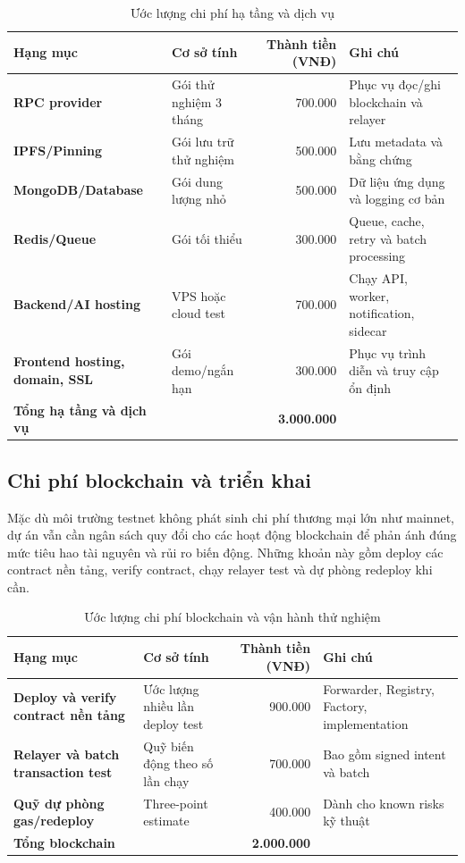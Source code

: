 \begin{table}[H]
\centering
\caption{Ước lượng chi phí hạ tầng và dịch vụ}
\label{tab:infra-cost-estimate}
\begin{tabularx}{\textwidth}{| >{\bfseries}p{4.5cm} | p{4cm} | r | X |}
\hline
Hạng mục & Cơ sở tính & Thành tiền (VNĐ) & Ghi chú \\
\hline
RPC provider & Gói thử nghiệm 3 tháng & 700.000 & Phục vụ đọc/ghi blockchain và relayer \\ \hline
IPFS/Pinning & Gói lưu trữ thử nghiệm & 500.000 & Lưu metadata và bằng chứng \\ \hline
MongoDB/Database & Gói dung lượng nhỏ & 500.000 & Dữ liệu ứng dụng và logging cơ bản \\ \hline
Redis/Queue & Gói tối thiểu & 300.000 & Queue, cache, retry và batch processing \\ \hline
Backend/AI hosting & VPS hoặc cloud test & 700.000 & Chạy API, worker, notification, sidecar \\ \hline
Frontend hosting, domain, SSL & Gói demo/ngắn hạn & 300.000 & Phục vụ trình diễn và truy cập ổn định \\
\hline
\textbf{Tổng hạ tầng và dịch vụ} &  & \textbf{3.000.000} &  \\
\hline
\end{tabularx}
\end{table}

\iffalse
\subsection{Chi phí blockchain và triển khai}

Mặc dù môi trường testnet không phát sinh chi phí thương mại lớn như mainnet, dự án vẫn cần ngân sách quy đổi cho các hoạt động blockchain để phản ánh đúng mức tiêu hao tài nguyên và rủi ro biến động. Những khoản này gồm deploy các contract nền tảng, verify contract, chạy relayer test và dự phòng redeploy khi cần.

\begin{table}[H]
\centering
\caption{Ước lượng chi phí blockchain và vận hành thử nghiệm}
\label{tab:blockchain-cost-estimate}
\begin{tabularx}{\textwidth}{| >{\bfseries}p{4.7cm} | p{3.8cm} | r | X |}
\hline
Hạng mục & Cơ sở tính & Thành tiền (VNĐ) & Ghi chú \\
\hline
Deploy và verify contract nền tảng & Ước lượng nhiều lần deploy test & 900.000 & Forwarder, Registry, Factory, implementation \\ \hline
Relayer và batch transaction test & Quỹ biến động theo số lần chạy & 700.000 & Bao gồm signed intent và batch \\ \hline
Quỹ dự phòng gas/redeploy & Three-point estimate & 400.000 & Dành cho known risks kỹ thuật \\
\hline
\textbf{Tổng blockchain} &  & \textbf{2.000.000} &  \\
\hline
\end{tabularx}
\end{table}

